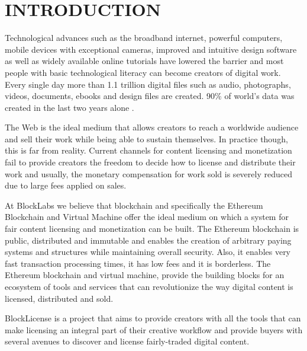 
\section{INTRODUCTION} \label{introduction}

 Technological advances such as the broadband internet, powerful computers, mobile devices with exceptional cameras, improved and intuitive design software as well as widely available online tutorials have lowered the barrier and most people with basic technological  literacy can become creators of digital work. Every single day more than 1.1 trillion digital files such as audio, photographs, videos, documents, ebooks and design files are created. 90\% of world's data was created in the last two years alone \cite{ibm}. 

The Web is the ideal medium that allows creators to reach a worldwide audience and sell their work while being able to sustain themselves. In practice though, this is far from reality. Current channels for content licensing and monetization fail to provide creators the freedom to decide how to license and distribute their work and usually, the monetary compensation for work sold is severely reduced due to large fees applied on sales.

At BlockLabs we believe that blockchain and specifically the Ethereum \cite{buterin2013ethereum} Blockchain and Virtual Machine offer the ideal medium on which a system for fair content licensing and monetization can be built. The Ethereum blockchain is public, distributed and immutable and enables the creation of arbitrary paying systems and structures while maintaining overall security. Also, it enables very fast transaction processing times, it has low fees and it is borderless. The Ethereum blockchain and virtual machine, provide the building blocks for an ecosystem of tools and services that can revolutionize the way digital content is licensed, distributed and sold.

BlockLicense is a project that aims to provide creators with all the tools that can make licensing an integral part of their creative workflow and provide buyers with several avenues to discover and license fairly-traded digital content.